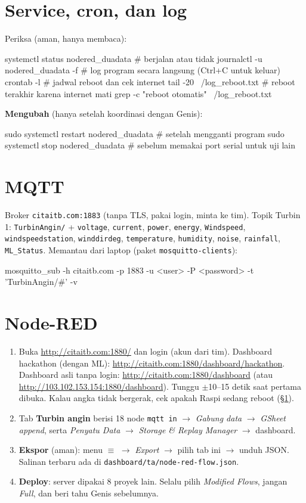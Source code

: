 \documentclass[10.5pt,a4paper]{article}
\newcommand{\cmd}[1]{\texttt{#1}}
\begin{document}
\section{Service, cron, dan log}\label{sec:service}
Periksa (aman, hanya membaca):
\begin{terminal}
systemctl status nodered_duadata          # berjalan atau tidak
journalctl -u nodered_duadata -f          # log program secara langsung (Ctrl+C untuk keluar)
crontab -l                                # jadwal reboot dan cek internet
tail -20 ~/log_reboot.txt                 # reboot terakhir karena internet mati
grep -c "reboot otomatis" ~/log_reboot.txt
\end{terminal}
\textbf{Mengubah} (hanya setelah koordinasi dengan Genis):
\begin{terminal}
sudo systemctl restart nodered_duadata    # setelah mengganti program
sudo systemctl stop nodered_duadata       # sebelum memakai port serial untuk uji lain
\end{terminal}

\section{MQTT}
Broker \cmd{citaitb.com:1883} (tanpa TLS, pakai login, minta ke tim). Topik Turbin 1: \cmd{TurbinAngin/} + \cmd{voltage}, \cmd{current}, \cmd{power},
\cmd{energy}, \cmd{Windspeed}, \cmd{windspeedstation}, \cmd{winddirdeg}, \cmd{temperature}, \cmd{humidity}, \cmd{noise}, \cmd{rainfall}, \cmd{ML\_Status}.
Memantau dari laptop (paket \cmd{mosquitto-clients}):
\begin{terminal}
mosquitto_sub -h citaitb.com -p 1883 -u <user> -P <password> -t 'TurbinAngin/#' -v
\end{terminal}

\section{Node-RED}
\begin{enumerate}
  \item Buka \url{http://citaitb.com:1880/} dan login (akun dari tim). Dashboard hackathon (dengan ML): \url{http://citaitb.com:1880/dashboard/hackathon}. Dashboard asli tanpa login: \url{http://citaitb.com:1880/dashboard}
        (atau \url{http://103.102.153.154:1880/dashboard}). Tunggu $\pm$10--15 detik saat pertama dibuka. Kalau angka tidak bergerak, cek apakah Raspi
        sedang reboot (\S\ref{sec:service}).
  \item Tab \textbf{Turbin angin} berisi 18 node \cmd{mqtt in} $\to$ \emph{Gabung data} $\to$ \emph{GSheet append}, serta \emph{Penyatu Data} $\to$ \emph{Storage \& Replay Manager} $\to$ dashboard.
  \item \textbf{Ekspor} (aman): menu $\equiv$ $\to$ \emph{Export} $\to$ pilih tab ini $\to$ unduh JSON. Salinan terbaru ada di \cmd{dashboard/ta/node-red-flow.json}.
  \item \textbf{Deploy}: server dipakai 8 proyek lain. Selalu pilih \emph{Modified Flows}, jangan \emph{Full}, dan beri tahu Genis sebelumnya.
\end{enumerate}
\end{document}
